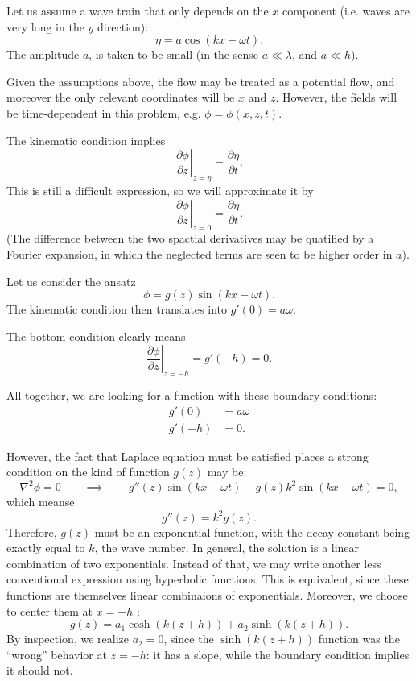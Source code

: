 Let us assume a wave train that only depends on the $x$ component
(i.e. waves are very long in the $y$ direction):
\[
\eta = a \cos(kx -\omega t) .
\]
The amplitude $a$, is taken to be small (in the sense $a\ll \lambda$,
and $a\ll h$).

Given the assumptions above, the flow may be treated as a potential
flow, and moreover the only relevant coordinates will be $x$ and
$z$. However, the fields will be time-dependent in this problem,
e.g. $\phi=\phi(x,z,t)$.


The kinematic condition  implies
\[
\left. \frac{\partial \phi}{\partial z}\right|_{z=\eta} =
\frac{\partial \eta}{\partial t} .
\]
This is still a difficult expression, so we will approximate it by
\[
\left. \frac{\partial \phi}{\partial z}\right|_{z=0} =
\frac{\partial \eta}{\partial t} .
\]
(The difference between the two spactial derivatives may be quatified
by a Fourier expansion, in which the neglected terms are seen to be
higher order in $a$).

Let us consider the ansatz
\[
\phi = g(z) \sin(kx -\omega t ) .
\]
The kinematic condition then translates into $g'(0)=a\omega$.

The bottom condition clearly means
\[
\left. \frac{\partial \phi}{\partial z}\right|_{z= -h } = g'(-h)= 0 .
\]


All together, we are looking for a function with these boundary
conditions:
\begin{align}
  g'(0) &=  a \omega \\
  g'(-h) &= 0 .
\end{align}

However, the fact that Laplace equation must be satisfied places a
strong condition on the kind of function $g(z)$ may be:
\[
\nabla^2 \phi = 0 \qquad \implies \qquad
g''(z)  \sin(kx -\omega t ) - g(z)  k^2 \sin(kx -\omega t ) = 0 ,
\]
which meanse
\[
g''(z)  = k^2 g(z) .
\]
Therefore, $g(z)$ must be an exponential function, with the decay
constant being exactly equal to $k$, the wave number. In general, the
solution is a linear combination of two exponentials. Instead of that,
we may write another less conventional expression using hyperbolic
functions. This is equivalent, since these functions are themselves
linear combinaions of exponentials. Moreover, we choose to center them
at $x=-h$ :
\[
g(z)  = a_1 \cosh(k(z+h)) + a_2 \sinh(k(z+h)) .
\]
By inspection, we realize $a_2=0$, since the $\sinh(k(z+h))$ function
was the ``wrong'' behavior at $z=-h$: it has a slope, while the
boundary condition implies it should not.

